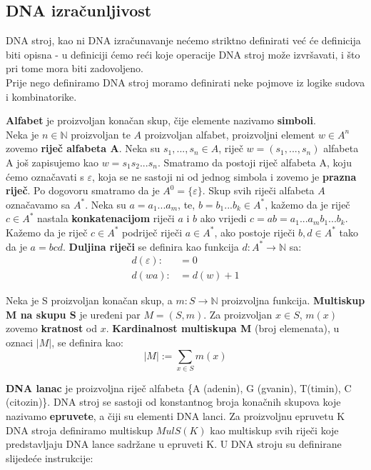 \documentclass[a4paper,oneside,12pt]{memoir} %
\begin{document}
\begin{spacing}{1.5}
\section{DNA izračunljivost}
DNA stroj, kao ni DNA izračunavanje nećemo striktno definirati već će definicija biti opisna - u definiciji ćemo reći koje operacije DNA stroj može izvršavati, i što pri tome mora biti zadovoljeno.\\ Prije nego definiramo DNA stroj moramo definirati neke pojmove iz logike sudova i kombinatorike.
\begin{defn}
\textbf{Alfabet} je proizvoljan konačan skup, čije elemente nazivamo \textbf{simboli}.\\
Neka je $n \in \mathbb{N}$ proizvoljan te $A$ proizvoljan alfabet, proizvoljni element $w \in A^n$ zovemo \textbf{riječ alfabeta A}. Neka su $s_1,..., s_n \in A$, riječ $w=(s_1,...,s_n)$ alfabeta A još zapisujemo kao $w=s_1s_2...s_n$. Smatramo da postoji riječ alfabeta A, koju ćemo označavati s $\varepsilon$, koja se ne sastoji ni od jednog simbola i zovemo je \textbf{prazna riječ}. Po dogovoru smatramo da je $A^0=\{\varepsilon\}$. Skup svih riječi alfabeta $A$ označavamo sa $A^*$. Neka su $a=a_1...a_m$, te, $b=b_1...b_k \in A^*$, kažemo da je riječ $c \in A^*$ nastala \textbf{konkatenacijom} riječi $a$ i $b$ ako vrijedi $c=ab=a_1...a_mb_1...b_k$. Kažemo da je riječ $c \in A^*$ podriječ riječi $a \in A^*$, ako postoje riječi $b, d \in A^*$ tako da je $a=bcd$. \textbf{Duljina riječi} se definira kao funkcija $d:A^*\to \mathbb{N}$ sa:
\begin{align*}
	d(\varepsilon) :&= 0 \\
	d(wa) :&= d(w)+1
\end{align*}
\end{defn}
\begin{defn}
Neka je S proizvoljan konačan skup, a $m:S \to \mathbb{N}$ proizvoljna funkcija. \textbf{Multiskup M na skupu S} je uređeni par $M=(S,m)$. Za proizvoljan $x\in S$, $m(x)$ zovemo \textbf{kratnost} od $x$. \textbf{Kardinalnost multiskupa M} (broj elemenata), u oznaci $|M|$, se definira kao:
\[|M|:=\sum_{x \in S} m(x)\]
\end{defn}
\begin{defn}
 \textbf{DNA lanac} je proizvoljna riječ alfabeta \{A (adenin), G (gvanin), T(timin), C (citozin)\}. DNA stroj se sastoji od konstantnog broja konačnih skupova koje nazivamo \textbf{epruvete}, a čiji su elementi DNA lanci. Za proizvoljnu epruvetu K DNA stroja definiramo multiskup $MulS(K)$ kao multiskup svih riječi koje predstavljaju DNA lance sadržane u epruveti K. U DNA stroju su definirane slijedeće instrukcije:

\end{defn}
\end{spacing}
\end{document}
